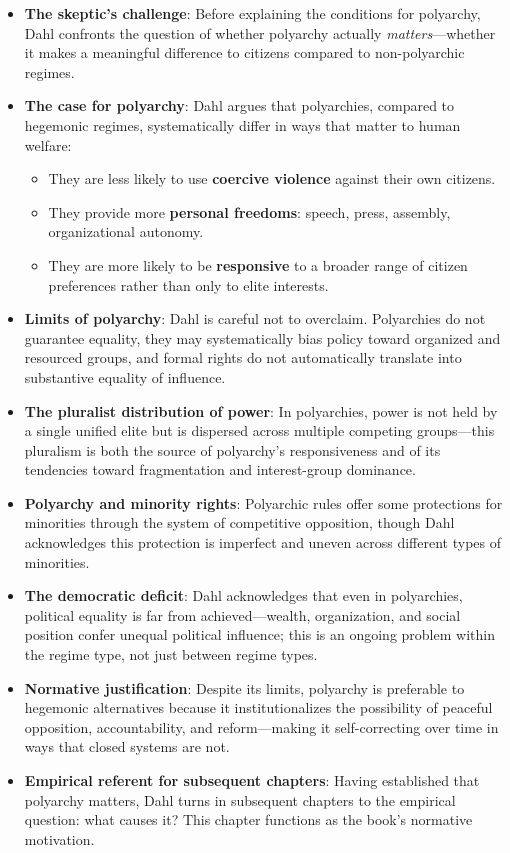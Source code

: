 \documentclass[12pt]{article}
\begin{document}
\begin{itemize}[leftmargin=*, itemsep=4pt]
    \item \textbf{The skeptic's challenge}: Before explaining the conditions for polyarchy, Dahl confronts the question of whether polyarchy actually \emph{matters}---whether it makes a meaningful difference to citizens compared to non-polyarchic regimes.
    \item \textbf{The case for polyarchy}: Dahl argues that polyarchies, compared to hegemonic regimes, systematically differ in ways that matter to human welfare:
        \begin{itemize}
            \item They are less likely to use \textbf{coercive violence} against their own citizens.
            \item They provide more \textbf{personal freedoms}: speech, press, assembly, organizational autonomy.
            \item They are more likely to be \textbf{responsive} to a broader range of citizen preferences rather than only to elite interests.
        \end{itemize}
    \item \textbf{Limits of polyarchy}: Dahl is careful not to overclaim. Polyarchies do not guarantee equality, they may systematically bias policy toward organized and resourced groups, and formal rights do not automatically translate into substantive equality of influence.
    \item \textbf{The pluralist distribution of power}: In polyarchies, power is not held by a single unified elite but is dispersed across multiple competing groups---this pluralism is both the source of polyarchy's responsiveness and of its tendencies toward fragmentation and interest-group dominance.
    \item \textbf{Polyarchy and minority rights}: Polyarchic rules offer some protections for minorities through the system of competitive opposition, though Dahl acknowledges this protection is imperfect and uneven across different types of minorities.
    \item \textbf{The democratic deficit}: Dahl acknowledges that even in polyarchies, political equality is far from achieved---wealth, organization, and social position confer unequal political influence; this is an ongoing problem within the regime type, not just between regime types.
    \item \textbf{Normative justification}: Despite its limits, polyarchy is preferable to hegemonic alternatives because it institutionalizes the possibility of peaceful opposition, accountability, and reform---making it self-correcting over time in ways that closed systems are not.
    \item \textbf{Empirical referent for subsequent chapters}: Having established that polyarchy matters, Dahl turns in subsequent chapters to the empirical question: what causes it? This chapter functions as the book's normative motivation.
\end{itemize}
\end{document}
